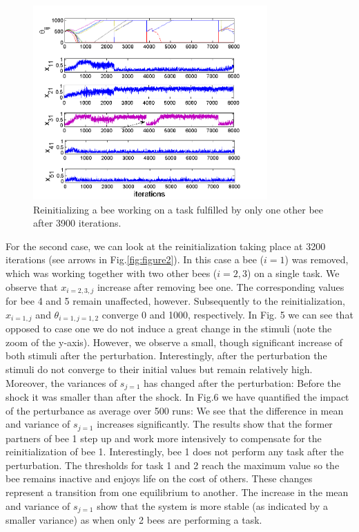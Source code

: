 \begin{figure}[ht!]
	\centering
	\includegraphics[width=0.8\textwidth]{figures/figure1.png}
	\caption{Reinitializing a bee working on a task fulfilled by only one other bee after 3900 iterations.}
	\label{fig:figure1}
\end{figure}

For the second case, we can look at the reinitialization taking place at 3200 iterations (see arrows in Fig.\ref{fig:figure2}). In this case a bee ($i=1$) was removed, which was working together with two other bees ($i=2,3$) on a single task. We observe that $x_{i=2,3,j}$ increase after removing bee one. The corresponding values for bee 4 and 5 remain unaffected, however. Subsequently to the reinitialization, $x_{i=1,j}$ and $\theta_{i=1,j=1,2}$ converge 0 and 1000, respectively. In Fig. 5 we can see that opposed to case one we do not induce a great change in the stimuli (note the zoom of the y-axis). However, we observe a small, though significant increase of both stimuli after the perturbation. Interestingly, after the perturbation the stimuli do not converge to their initial values but remain relatively high. Moreover, the variances of $s_{j=1}$ has changed after the perturbation: Before the shock it was smaller than after the shock. In Fig.6 we have quantified the impact of the perturbance as average over 500 runs: We see that the difference in mean and variance of $s_{j=1}$ increases significantly. 
The results show that the former partners of bee 1 step up and work more intensively to compensate for the reinitialization of bee 1. Interestingly, bee 1 does not perform any task after the perturbation. The thresholds for task 1 and 2 reach the maximum value so the bee remains inactive and enjoys life on the cost of others. These changes represent a transition from one equilibrium to another. The increase in the mean and variance of $s_{j=1}$ show that the system is more stable (as indicated by a smaller variance) as when only 2 bees are performing a task.

